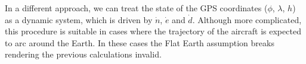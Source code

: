 In a different approach, we can treat the state of the GPS coordinates ($\phi$, $\lambda$, $h$) as a dynamic system, which is driven by $\dot{n}$, $\dot{e}$ and $\dot{d}$. Although more complicated, this procedure is suitable in cases where the trajectory of the aircraft is expected to arc around the Earth. In these cases the Flat Earth assumption breaks rendering the previous calculations invalid.

